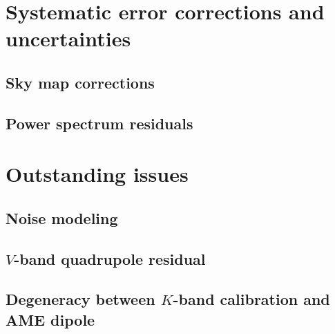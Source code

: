 \documentclass[twocolumn]{../../common/aa}
\begin{document}
\section{Systematic error corrections and uncertainties}
\label{sec:systematics}

\subsection{Sky map corrections}



\subsection{Power spectrum residuals}


















\section{Outstanding issues}
\label{sec:issues}


\subsection{Noise modeling}
\label{sec:noisemodel}


\subsection{$V$-band quadrupole residual}
\label{sec:quadres}


\subsection{Degeneracy between $K$-band calibration and AME dipole}
\label{sec:ame_Kband}
\end{document}

